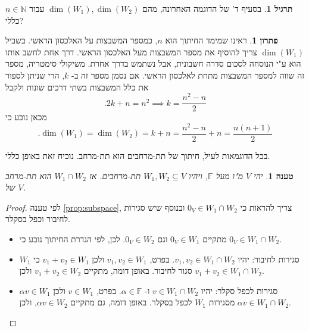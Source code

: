 \documentclass[12pt]{report}
\theoremstyle{plain}
\newtheorem{proposition}[theorem]{טענה}
\theoremstyle{definition}
\newtheorem{exercise}{תרגיל}[chapter]
\newtheorem*{solution}{פתרון}
\newcommand{\N}{\mathbb{N}}
\newcommand{\F}{\mathbb{F}}
\newcommand{\0}{\mathbf{0}}
\begin{document}
\begin{exercise}
בסעיף ד' של הדוגמה האחרונה, מהם 
$\dim(W_1),\dim(W_2)$
עבור 
$n\in\N$
כללי?
\end{exercise}

\begin{solution}
ראינו שמימד החיתוך הוא 
$n$,
כמספר המשבצות על האלכסון הראשי.
בשביל 
$\dim(W_1)$
צריך להוסיף את מספר המשבצות מעל האלכסון הראשי. דרך אחת לחשב אותו הוא ע"י הנוסחה לסכום סדרה חשבונית, אבל נשתמש בדרך אחרת. משיקולי סימטריה, מספר זה שווה למספר המשבצות מתחת לאלכסון הראשי. אם נסמן מספר זה ב-
$k$,
הרי שניתן לספור את כלל המשבצות בשתי דרכים שונות ולקבל
$$
.2k+n=n^2 \implies k=\frac{n^2-n}{2}
$$
מכאן נובע כי
$$
.\dim(W_1)=\dim(W_2)=k+n=\frac{n^2-n}{2}+n=\frac{n(n+1)}{2}
$$
\end{solution}

בכל הדוגמאות לעיל, חיתוך של תת-מרחבים הוא תת-מרחב. נוכיח זאת באופן כללי. 

\begin{proposition}
יהי 
$V$
מ"ו מעל
$\F$,
ויהיו 
$W_1,W_2\subseteq V$
תת-מרחבים. אז 
$W_1\cap W_2$
הוא תת-מרחב של
$V$.
\end{proposition}

\begin{proof}
לפי טענה
\ref{prop:subspace},
צריך להראות כי
$0_V\in W_1\cap W_2$
ובנוסף שיש סגירות לחיבור וכפל בסקלר.

\begin{itemize}
\item 
מתקיים
$0_V\in W_1$
וגם
$0_V\in W_2$.
לכן, לפי הגדרת החיתוך נובע כי
$0_V\in W_1\cap W_2$.


\item
סגירות לחיבור: יהיו 
$v_1,v_2\in W_1\cap W_2$.
בפרט,
$v_1,v_2\in W_1$
ולכן
$v_1+v_2\in W_1$
כי
$W_1$
סגור לחיבור.
באופן דומה, מתקיים
$v_1+v_2\in W_2$
ולכן
$v_1+v_2\in W_1\cap W_2$.


\item
סגירות לכפל סקלר: יהיו 
$v\in W_1\cap W_2$
ו-
$\alpha\in\F$.
בפרט,
$v\in W_1$
ולכן
$\alpha v\in W_1$
מסגירות 
$W_1$
לכפל בסקלר. באופן דומה, גם מתקיים
$\alpha v\in W_2$,
ולכן
$\alpha v\in W_1\cap W_2$.


\end{itemize}
\end{proof}
\end{document}
